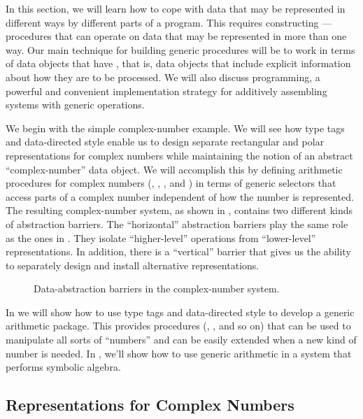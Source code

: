 In this section, we will learn how to cope with data that may be represented in different ways by different parts of a program.
This requires constructing ---procedures that can operate on data that may be represented in more than one way.
Our main technique for building generic procedures will be to work in terms of data objects that have , that is, data objects that include explicit information about how they are to be processed.
We will also discuss  programming, a powerful and convenient implementation strategy for additively assembling systems with generic operations.

We begin with the simple complex-number example.
We will see how type tags and data-directed style enable us to design separate rectangular and polar representations for complex numbers while maintaining the notion of an abstract “complex-number” data object.
We will accomplish this by defining arithmetic procedures for complex numbers (, , , and ) in terms of generic selectors that access parts of a complex number independent of how the number is represented.
The resulting complex-number system, as shown in , contains two different kinds of abstraction barriers.
The “horizontal” abstraction barriers play the same role as the ones in .
They isolate “higher-level” operations from  “lower-level” representations.
In addition, there is a “vertical” barrier that gives us the ability to separately design and install alternative representations.

\begin{figure}[tb]
	\centering
	
	\caption{
		Data-abstraction barriers in the complex-number system.
	}
	\label{Figure 2.19}
\end{figure}

In  we will show how to use type tags and data-directed style to develop a generic arithmetic package.
This provides procedures (, , and so on) that can be used to manipulate all sorts of “numbers” and can be easily extended when a new kind of number is needed.
In , we’ll show how to use generic arithmetic in a system that performs symbolic algebra.



\subsection{Representations for Complex Numbers}
\label{Section 2.4.1}

